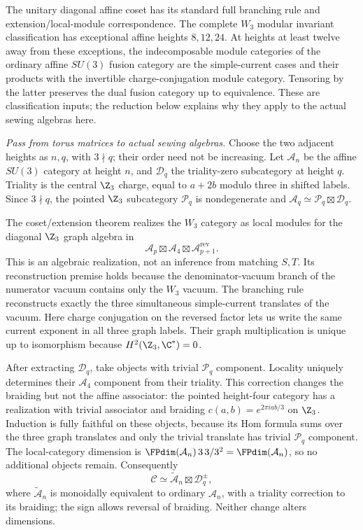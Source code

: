 \begin{constructioninput}
The unitary diagonal affine coset has its standard full branching rule
and extension/local-module correspondence. The complete $W_3$ modular
invariant classification has exceptional affine heights $8,12,24$.
At heights at least twelve away from these exceptions, the
indecomposable module categories of the
ordinary affine $SU(3)$ fusion category are the simple-current cases
and their products with the invertible charge-conjugation module
category. Tensoring by the latter preserves the dual fusion category
up to equivalence. These are classification inputs; the reduction below
explains why they apply to the actual sewing algebras here.
\end{constructioninput}

\emph{Pass from torus matrices to actual sewing algebras.}
Choose the two adjacent heights as $n,q$, with $3\nmid q$; their
order need not be increasing. Let $\mathcal A_n$ be the affine
$SU(3)$ category at height $n$, and $\mathcal D_q$ the triality-zero
subcategory at height $q$. Triality is the central $\Z_3$ charge,
equal to $a+2b$ modulo three in shifted labels. Since $3\nmid q$,
the pointed $\Z_3$ subcategory $\mathcal P_q$ is nondegenerate and
$\mathcal A_q\simeq\mathcal P_q\boxtimes\mathcal D_q$.

The coset/extension theorem realizes the $W_3$ category as local
modules for the diagonal $\Z_3$ graph algebra in
\[
 \mathcal A_p\boxtimes\mathcal A_4
                 \boxtimes\mathcal A_{p+1}^{\mathrm{rev}}.
\]
This is an algebraic realization, not an inference from matching
$S,T$. Its reconstruction premise holds because the denominator-vacuum
branch of the numerator vacuum contains only the $W_3$ vacuum. The
branching rule reconstructs exactly the three simultaneous
simple-current translates of the vacuum. Here charge conjugation on
the reversed factor lets us write the same current exponent in all
three graph labels. Their graph multiplication
is unique up to isomorphism because $H^2(\Z_3,\C^*)=0$.

After extracting $\mathcal D_q$, take objects with trivial
$\mathcal P_q$ component. Locality uniquely determines their
$\mathcal A_4$ component from their triality. This correction changes
the braiding but not the affine associator: the pointed height-four
category has a realization with trivial associator and braiding
$c(a,b)=e^{2\pi iab/3}$ on $\Z_3$. Induction is fully
faithful on these objects, because its Hom formula sums over the three
graph translates and only the trivial translate has trivial
$\mathcal P_q$ component. The local-category dimension is
$\FPdim(\mathcal A_n)\,3\,3/3^2=\FPdim(\mathcal A_n)$, so no
additional objects remain. Consequently
\[
 \mathcal C\simeq\widetilde{\mathcal A}_n
                      \boxtimes\mathcal D_q^{\pm},
\]
where $\widetilde{\mathcal A}_n$ is monoidally equivalent to ordinary
$\mathcal A_n$, with a triality correction to its braiding; the sign
allows reversal of braiding. Neither change alters dimensions.

